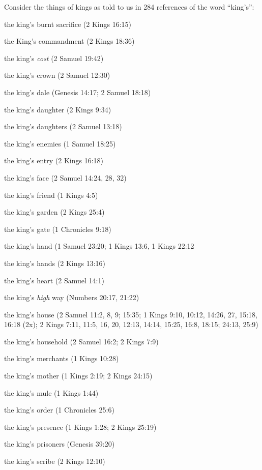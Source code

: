 Consider the things of kings as told to us in 284 references of the word ``king's'':
\begin{compactenum}
    \item the king's burnt sacrifice (2 Kings 16:15)
    \item the King's commandment (2 Kings 18:36)
    \item the king's \emph{cost} (2 Samuel 19:42)
    \item the king's crown (2 Samuel 12:30)
    \item the king's dale (Genesis 14:17; 2 Samuel 18:18)
    \item the king's daughter (2 Kings 9:34)
    \item the king's daughters (2 Samuel 13:18)
    \item the king's enemies (1 Samuel 18:25)
    \item the king's entry (2 Kings 16:18)
    \item the king's face (2 Samuel 14:24, 28, 32)
    \item the king's friend (1 Kings 4:5)
    \item the king's garden (2 Kings 25:4)
    \item the king's gate (1 Chronicles 9:18)
    \item the king's hand (1 Samuel 23:20; 1 Kings 13:6, 1 Kings 22:12
    \item the king's hands (2 Kings 13:16)
    \item the king's heart (2 Samuel 14:1)
    \item the king's \emph{high} way (Numbers 20:17, 21:22)
    \item the king's house (2 Samuel 11:2, 8, 9; 15:35; 1 Kings 9:10, 10:12, 14:26, 27, 15:18, 16:18 (2x); 2 Kings 7:11, 11:5, 16, 20, 12:13, 14:14, 15:25, 16:8, 18:15; 24:13, 25:9)
    \item the king's household (2 Samuel 16:2; 2 Kings 7:9)
    \item the king's merchants (1 Kings 10:28)
    \item the king's mother (1 Kings 2:19; 2 Kings 24:15)
    \item the king's mule (1 Kings 1:44)
    \item the king's order (1 Chronicles 25:6)
    \item the king's presence (1 Kings 1:28; 2 Kings 25:19)
    \item the king's prisoners (Genesis 39:20)
    \item the king's scribe (2 Kings 12:10)

\end{compactenum}
